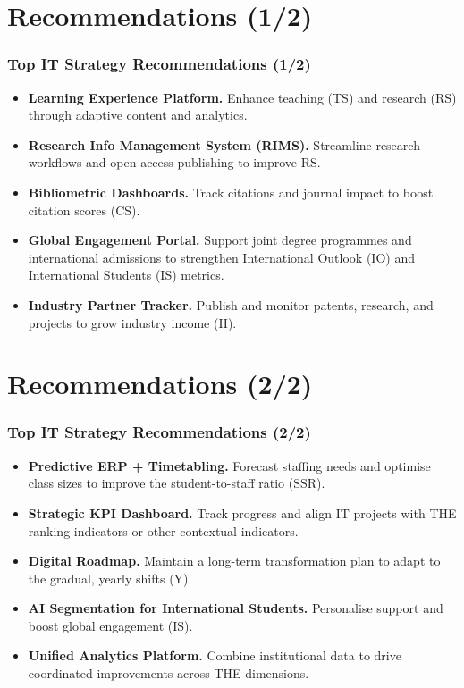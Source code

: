 \documentclass[aspectratio=169, table]{beamer}
\begin{document}
\section{Recommendations (1/2)}
\begin{frame}
	\vspace{20pt}
	\frametitle{Top IT Strategy Recommendations (1/2)}
	\begin{itemize}
		\item \textbf{Learning Experience Platform.} Enhance teaching (TS) and research (RS) through adaptive content and analytics.
		\item \textbf{Research Info Management System (RIMS).} Streamline research workflows and open-access publishing to improve RS.
		\item \textbf{Bibliometric Dashboards.} Track citations and journal impact to boost citation scores (CS).
		\item \textbf{Global Engagement Portal.} Support joint degree programmes and international admissions to strengthen International Outlook (IO) and International Students (IS) metrics.
		
		\item \textbf{Industry Partner Tracker.} Publish and monitor patents, research, and projects to grow industry income (II).
	\end{itemize}
\end{frame}


\section{Recommendations (2/2)}
\begin{frame}
	\vspace{20pt}
	\frametitle{Top IT Strategy Recommendations (2/2)}
	\begin{itemize}
		\item \textbf{Predictive ERP + Timetabling.} Forecast staffing needs and optimise class sizes to improve the student-to-staff ratio (SSR).
		\item \textbf{Strategic KPI Dashboard.} Track progress and align IT projects with THE ranking indicators or other contextual indicators.
		\item \textbf{Digital Roadmap.} Maintain a long-term transformation plan to adapt to the gradual, yearly shifts (Y).
		\item \textbf{AI Segmentation for International Students.} Personalise support and boost global engagement (IS).
		\item \textbf{Unified Analytics Platform.} Combine institutional data to drive coordinated improvements across THE dimensions.
	\end{itemize}
\end{frame}
\end{document}
